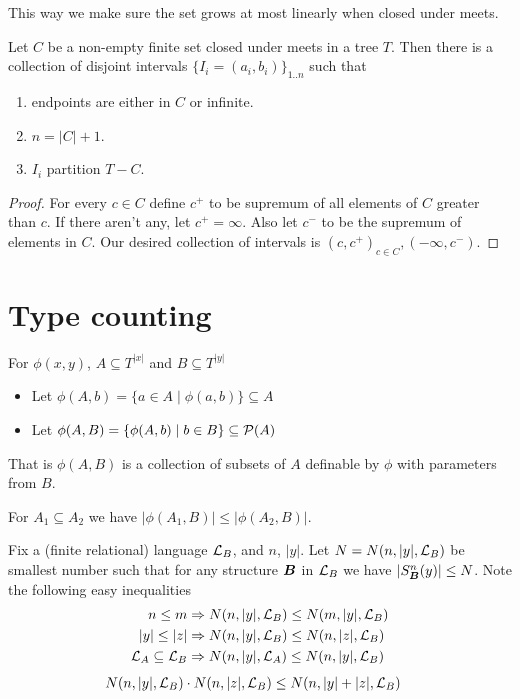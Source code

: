 \documentclass{amsart}
\DeclareMathOperator{\B}{\boldface B}
\begin{document}
This way we make sure the set grows at most linearly when closed under meets.

\begin{Lemma}
	Let $C$ be a non-empty finite set closed under meets in a tree $T$. Then there is a collection of disjoint intervals $\{I_i = (a_i, b_i)\}_{1..n}$ such that
	\begin{enumerate}
		\item endpoints are either in $C$ or infinite.
		\item $n = |C| + 1$.
		\item $I_i$ partition $T - C$.
	\end{enumerate}
\end{Lemma}

\begin{proof}
	For every $c \in C$ define $c^+$ to be supremum of all elements of $C$ greater than $c$. If there aren't any, let $c^+ = \infty$. Also let $c^-$ to be the supremum of elements in $C$. Our desired collection of intervals is $(c, c^+)_{c \in C}, (-\infty, c^-)$.
\end{proof}

\section{Type counting}

\begin{Definition} For $\phi(x, y)$, $A \subseteq T^{|x|}$ and $B \subseteq T^{|y|}$
\begin{itemize}
	\item Let $\phi(A, b) = \{a \in A \mid \phi(a, b)\} \subseteq A$
	\item Let $\phi(A, B) = \{\phi(A, b) \mid b \in B\} \subseteq \mathcal P(A)$	
\end{itemize}
\end{Definition}
That is $\phi(A, B)$ is a collection of subsets of $A$ definable by $\phi$ with parameters from $B$.

\begin{Note}
	For $A_1 \subseteq A_2$ we have $|\phi(A_1, B)| \leq |\phi(A_2, B)|$.
\end{Note}

\begin{Definition} \label{def_type_count}
	Fix a (finite relational) language $\mathcal L_B$, and $n$, $|y|$. Let $N = N(n, |y|, \mathcal L_B)$ be smallest number such that for any structure $\B$ in $\mathcal L_B$ we have $|S^n_{\B}(y)| \leq N$. Note the following easy inequalities
	\begin{align*}
		n \leq m &\Rightarrow N(n, |y|, \mathcal L_B) \leq N(m, |y|, \mathcal L_B) \\
		|y| \leq |z| &\Rightarrow N(n, |y|, \mathcal L_B) \leq N(n, |z|, \mathcal L_B) \\
		\mathcal L_A \subseteq \mathcal L_B &\Rightarrow N(n, |y|, \mathcal L_A) \leq N(n, |y|, \mathcal L_B)
	\end{align*}
	\begin{align*}
		N(n, |y|, \mathcal L_B) \cdot N(n, |z|, \mathcal L_B) &\leq N(n, |y|+|z|, \mathcal L_B) 
	\end{align*}
\end{Definition}
\end{document}
